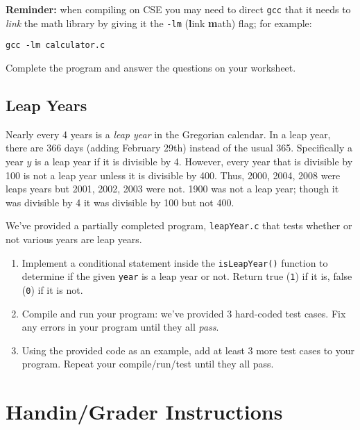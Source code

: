 \documentclass[12pt]{scrartcl}
\begin{document}
\textbf{Reminder:} when compiling on CSE you may need to direct \texttt{gcc}
that it needs to \emph{link} the math library by giving it the \texttt{-lm} 
(\textbf{l}ink \textbf{m}ath) flag; for example:

\texttt{gcc -lm calculator.c}

Complete the program and answer the questions on your worksheet.

\subsection{Leap Years}

Nearly every 4 years is a \emph{leap year} in the Gregorian calendar.
In a leap year, there are 366 days (adding February 29th) instead of the
usual 365.  Specifically a year $y$ is a leap year if it is divisible
by 4.  However, every year that is divisible by 100 is not a leap year 
unless it is divisible by 400.  Thus, 2000, 2004, 2008 were leaps years
but 2001, 2002, 2003 were not.  1900 was not a leap year; though it was
divisible by 4 it was divisible by 100 but not 400.

We've provided a partially completed program, \texttt{leapYear.c}
that tests whether or not various years are leap years.  

\begin{enumerate}
  \item Implement a conditional statement inside the 
  \texttt{isLeapYear()} function to determine if the given
  \texttt{year} is a leap year or not.  Return true (\texttt{1})
  if it is, false (\texttt{0}) if it is not.
  \item Compile and run your program: we've provided 3 
  hard-coded test cases.  Fix any errors in your program until they all 
  \emph{pass}.  
  \item Using the provided code as an example, add at least 3 more
  test cases to your program.  Repeat your compile/run/test until they
  all pass.
\end{enumerate}

\section{Handin/Grader Instructions}
\end{document}
